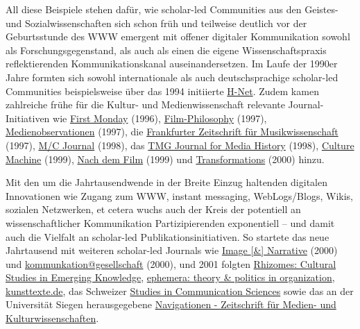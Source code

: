 \documentclass[a4paper,
fontsize=11pt,
oneside,
numbers=noperiodatend,
parskip=half-,
bibliography=totoc,
final
]{scrartcl}
\begin{document}
All diese Beispiele stehen dafür, wie scholar-led Communities aus den
Geistes- und Sozialwissenschaften sich schon früh und teilweise deutlich
vor der Geburtsstunde des WWW emergent mit offener digitaler
Kommunikation sowohl als Forschungsgegenstand, als auch als einen die
eigene Wissenschaftspraxis reflektierenden Kommunikationskanal
auseinandersetzen. Im Laufe der 1990er Jahre formten sich sowohl
internationale als auch deutschsprachige scholar-led Communities
beispielsweise über das 1994 initiierte
\href{https://www.h-net.org/lists/}{H-Net}. Zudem kamen zahlreiche frühe
für die Kultur- und Medienwissenschaft relevante Journal-Initiativen wie
\href{https://doi.org/10.5210/fm.v1i1.464}{First Monday} (1996),
\href{https://web.archive.org/web/20130305050839/http://www.film-philosophy.com/index.php/f-p/issue/view/3}{Film-Philosophy}
(1997),
\href{https://www.medienobservationen.de/redaktion/}{Medienobservationen}
(1997), die
\href{https://web.archive.org/web/19990117055559/http://www.rz.uni-frankfurt.de/FB/fb09/muwi/FZMw.html}{Frankfurter
Zeitschrift für Musikwissenschaft} (1997),
\href{https://journal.media-culture.org.au/index.php/mcjournal/issue/view/new}{M/C
Journal} (1998), das \href{https://www.tmgonline.nl/about/}{TMG Journal
for Media History} (1998), \href{https://culturemachine.net/}{Culture
Machine} (1999),
\href{https://nachdemfilm.de/issues/no-1-das-kino-bebt}{Nach dem Film}
(1999) und
\href{https://www.transformationsjournal.org/}{Transformations} (2000)
hinzu.

Mit den um die Jahrtausendwende in der Breite Einzug haltenden digitalen
Innovationen wie Zugang zum WWW, instant messaging, WebLogs/Blogs,
Wikis, sozialen Netzwerken, et cetera wuchs auch der Kreis der
potentiell an wissenschaftlicher Kommunikation Partizipierenden
exponentiell -- und damit auch die Vielfalt an scholar-led
Publikationsinitiativen. So startete das neue Jahrtausend mit weiteren
scholar-led Journals wie
\href{https://www.imageandnarrative.be/inarchive/index.htm}{Image
{[}\&{]} Narrative} (2000) und
\href{https://journals.sub.uni-hamburg.de/hup2/kommges/backlist}{kommunkation@gesellschaft}
(2000), und 2001 folgten
\href{http://rhizomes.net/files/issues.html}{Rhizomes: Cultural Studies
in Emerging Knowledge},
\href{http://www.ephemerajournal.org/what-ephemera}{ephemera: theory \&
politics in organization},
\href{https://www.kunsttexte.de}{kunsttexte.de}, das Schweizer
\href{https://www.hope.uzh.ch/scoms}{Studies in Communication Sciences}
sowie das an der Universität Siegen herausgegebene
\href{https://www.universi.uni-siegen.de/katalog/zeitschriften/navigationen/}{Navigationen
- Zeitschrift für Medien- und Kulturwissenschaften}.
\end{document}
